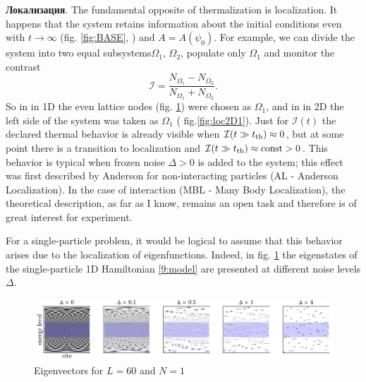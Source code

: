 
\textbf{Локализация}. The fundamental opposite of thermalization is localization. It happens that the system retains information about the initial conditions even with $t \to \infty$ (fig. \ref{fig:BASE}, ) and $A = A(\psi_0)$. For example, we can divide the system into two equal subsystems$\Omega_1,\, \Omega_2$, populate only $\Omega_1$ and monitor the contrast
\begin{equation*}
	\mathcal{I} = \frac{N_{\Omega_1}-N_{\Omega_2}}{N_{\Omega_1}+N_{\Omega_2}}.
\end{equation*}
So in \cite{schreiber_observation_2015} in 1D the even lattice nodes (fig. \ref{fig:loc1}) were chosen as $\Omega_1$, and in \cite{Choi_2016} in 2D the left side of the system was taken as $\Omega_1$ ( fig.\ref{fig:loc2D1}). Just for $\mathcal{I}(t)$ the declared thermal behavior is already visible when $\mathcal{I}(t \gg t_{\textnormal{th}}) \approx 0$, but at some point there is a transition to localization and $ \mathcal{I} (t \gg t_{\textnormal{th}}) \approx \textnormal{const} > 0$. This behavior is typical when frozen noise $\Delta > 0$ is added to the system; this effect was first described by Anderson \cite{PhysRev.109.1492} for non-interacting particles (AL - Anderson Localization). In the case of interaction (MBL - Many Body Localization), the theoretical description, as far as I know, remains an open task and therefore is of great interest for experiment.

For a single-particle problem, it would be logical to assume that this behavior arises due to the localization of eigenfunctions. Indeed, in fig. \ref{fig:loc1} the eigenstates of the single-particle 1D Hamiltonian \eqref{9:model} are presented at different noise levels $\Delta$.



\begin{figure}[h]
    \centering
    \includegraphics{imgs/evecs.pdf}
    \caption{Eigenvectors for $L=60$ and $N=1$}
    \label{fig:loc1}
\end{figure}

